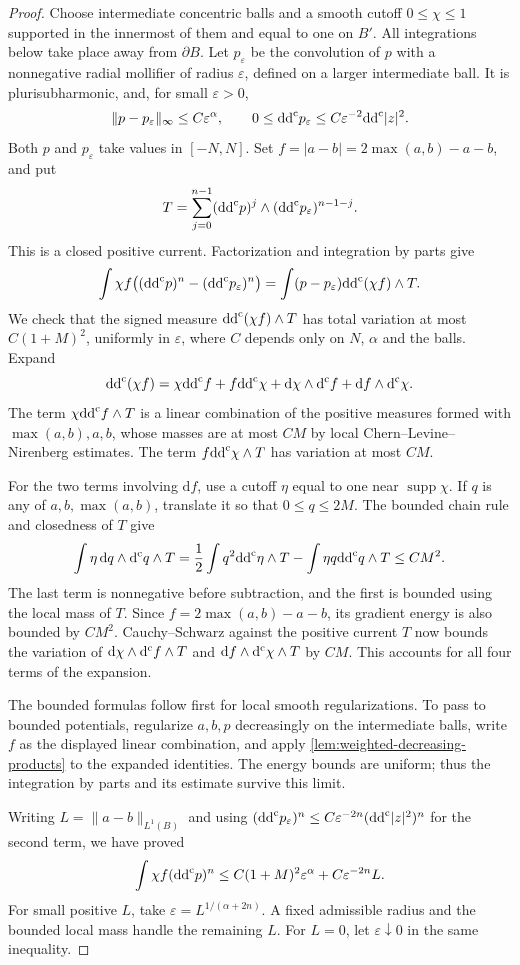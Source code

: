 \begin{proof}
Choose intermediate concentric balls and a smooth cutoff $0\leq\chi\leq1$ supported in the innermost of them and equal to one on $B'$. All integrations below take place away from $\partial B$. Let $p_\varepsilon$ be the convolution of $p$ with a nonnegative radial mollifier of radius $\varepsilon$, defined on a larger intermediate ball. It is plurisubharmonic, and, for small $\varepsilon>0$,
\[
 \|p-p_\varepsilon\|_\infty\leq C\varepsilon^\alpha,
 \qquad 0\leq\mathrm{dd}^{\mathrm{c}} p_\varepsilon\leq C\varepsilon^{-2}\mathrm{dd}^{\mathrm{c}}|z|^2.
\]
Both $p$ and $p_\varepsilon$ take values in $[-N,N]$. Set $f=|a-b|=2\max(a,b)-a-b$, and put
\[
 T=\sum_{j=0}^{n-1}(\mathrm{dd}^{\mathrm{c}} p)^j\wedge(\mathrm{dd}^{\mathrm{c}} p_\varepsilon)^{n-1-j}.
\]
This is a closed positive current. Factorization and integration by parts give
\[
 \int\chi f\bigl((\mathrm{dd}^{\mathrm{c}} p)^n-(\mathrm{dd}^{\mathrm{c}} p_\varepsilon)^n\bigr)
 =\int(p-p_\varepsilon)\mathrm{dd}^{\mathrm{c}}(\chi f)\wedge T.
\]
We check that the signed measure $\mathrm{dd}^{\mathrm{c}}(\chi f)\wedge T$ has total variation at most $C(1+M)^2$, uniformly in $\varepsilon$, where $C$ depends only on $N$, $\alpha$ and the balls. Expand
\[
 \mathrm{dd}^{\mathrm{c}}(\chi f)=\chi\mathrm{dd}^{\mathrm{c}} f+f\mathrm{dd}^{\mathrm{c}}\chi+\mathrm d\chi\wedge\mathrm d^{\mathrm c} f+\mathrm df\wedge\mathrm d^{\mathrm c}\chi.
\]
The term $\chi\mathrm{dd}^{\mathrm{c}} f\wedge T$ is a linear combination of the positive measures formed with $\max(a,b),a,b$, whose masses are at most $CM$ by local Chern--Levine--Nirenberg estimates. The term $f\mathrm{dd}^{\mathrm{c}}\chi\wedge T$ has variation at most $CM$.

For the two terms involving $\mathrm df$, use a cutoff $\eta$ equal to one near $\operatorname{supp}\chi$. If $q$ is any of $a,b,\max(a,b)$, translate it so that $0\leq q\leq2M$. The bounded chain rule and closedness of $T$ give
\[
 \int\eta\,\mathrm dq\wedge\mathrm d^{\mathrm c} q\wedge T
 =\frac12\int q^2\mathrm{dd}^{\mathrm{c}}\eta\wedge T
       -\int\eta q\mathrm{dd}^{\mathrm{c}} q\wedge T\leq CM^2.
\]
The last term is nonnegative before subtraction, and the first is bounded using the local mass of $T$. Since $f=2\max(a,b)-a-b$, its gradient energy is also bounded by $CM^2$. Cauchy--Schwarz against the positive current $T$ now bounds the variation of $\mathrm d\chi\wedge\mathrm d^{\mathrm c} f\wedge T$ and $\mathrm df\wedge\mathrm d^{\mathrm c}\chi\wedge T$ by $CM$. This accounts for all four terms of the expansion.

The bounded formulas follow first for local smooth regularizations. To pass to bounded potentials, regularize $a,b,p$ decreasingly on the intermediate balls, write $f$ as the displayed linear combination, and apply \cref{lem:weighted-decreasing-products} to the expanded identities. The energy bounds are uniform; thus the integration by parts and its estimate survive this limit.

Writing $L=\|a-b\|_{L^1(B)}$ and using $(\mathrm{dd}^{\mathrm{c}} p_\varepsilon)^n\leq C\varepsilon^{-2n}(\mathrm{dd}^{\mathrm{c}}|z|^2)^n$ for the second term, we have proved
\begin{equation}\label{eq:holder-reference-local-balance}
 \int\chi f(\mathrm{dd}^{\mathrm{c}} p)^n
 \leq C(1+M)^2\varepsilon^\alpha+C\varepsilon^{-2n}L.
\end{equation}
For small positive $L$, take $\varepsilon=L^{1/(\alpha+2n)}$. A fixed admissible radius and the bounded local mass handle the remaining $L$. For $L=0$, let $\varepsilon\downarrow0$ in the same inequality.
\end{proof}

